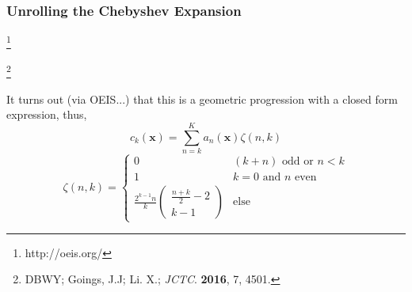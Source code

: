 \documentclass{beamer}
\newcommand\blfootnote[1]{%
  \begingroup
  \renewcommand\thefootnote{}\footnote{#1}%
  \addtocounter{footnote}{-1}%
  \endgroup
}
\begin{document}
\begin{frame}
\frametitle{Unrolling the Chebyshev Expansion}
\blfootnote{http://oeis.org/}
\blfootnote{DBWY; Goings, J.J; Li. X.; \emph{JCTC}. \textbf{2016}, 7, 4501.}

It turns out (via OEIS...) that this is a geometric progression with a closed form expression,
thus,
\begin{equation*}
c_k(\mathbf{x}) = \sum_{n = k}^K a_n(\mathbf{x}) \zeta(n,k)
\end{equation*}
\begin{equation*}
\zeta(n,k) = \begin{cases}
0 & (k+n)\text{ odd or } n < k \\
1 & k = 0 \text{ and } n \text{ even}\\
\frac{2^{k-1}n}{k} \begin{pmatrix} \frac{n+k}{2} - 2 \\ k - 1\end{pmatrix} & \text{else}
\end{cases}
\end{equation*}

\end{frame}
\end{document}
